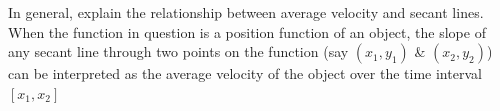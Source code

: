 {In general, explain the relationship between average velocity and secant lines.}
{When the function in question is a position function of an object, the slope of any secant line through two points on the function (say $(x_1,y_1)$ \& $(x_2,y_2)$) can be interpreted as the average velocity of the object over the time interval $[x_1,x_2]$}